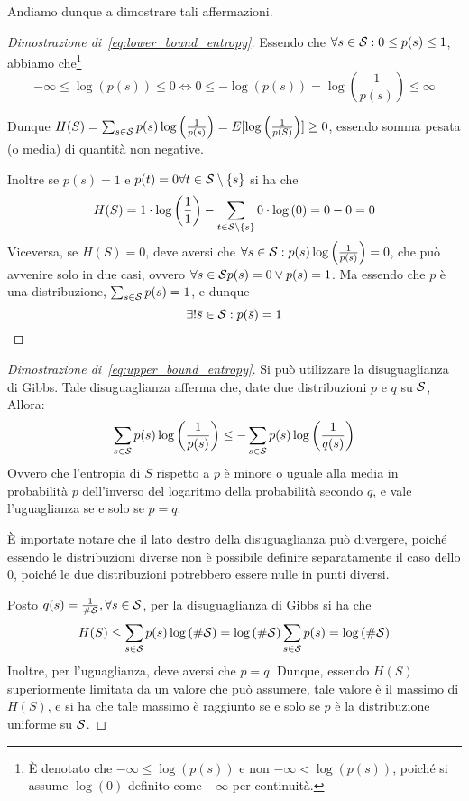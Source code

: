 Andiamo dunque a dimostrare tali affermazioni.

\begin{proof}[Dimostrazione di~\ref{eq:lower_bound_entropy}]
  Essendo che \(\forall s \in \mathcal{S}: 0\leq p(s) \leq 1\), abbiamo che\footnote{È denotato che \(-\infty \leq \log\left(p(s)\right)\) e non \(-\infty < \log\left(p(s)\right)\), poiché si assume \(\log\left(0\right)\) definito come \(-\infty\) per continuità.}
  \[-\infty \leq \log\left(p(s)\right) \leq 0 \iff  0 \leq -\log\left(p(s)\right) = \log\left(\frac{1}{p(s)}\right) \leq \infty\]

  Dunque \(H(S) = \sum_{s \in \mathcal{S}} p(s) \log\left(\frac{1}{p(s)}\right) = E[\log\left(\frac{1}{p(S)}\right)] \geq 0\), essendo somma pesata (o media) di quantità non negative.

  Inoltre se \(p(s) = 1\) e \(p(t) = 0 \forall t \in \SCal \setminus \set{s}\) si ha che
  \[H(S) = 1 \cdot \log\left(\frac{1}{1}\right) - \sum_{t \in \SCal \setminus \set{s}} 0 \cdot \log\left(0\right) = 0 - 0 = 0\]
  Viceversa, se \(H(S) = 0\), deve aversi che \(\forall s \in \mathcal{S}: p(s) \log\left(\frac{1}{p(s)}\right) = 0\), che può avvenire solo in due casi, ovvero \(\forall s \in \mathcal{S} p(s) = 0 \lor p(s) = 1\).
  Ma essendo che \(p\) è una distribuzione, \(\sum_{s \in \mathcal{S}} p(s) = 1\), e dunque
  \[\exists!\bar{s} \in \mathcal{S}: p(\bar{s}) = 1\]
\end{proof}

\begin{proof}[Dimostrazione di~\ref{eq:upper_bound_entropy}]
  Si può utilizzare la disuguaglianza di Gibbs.
  Tale disuguaglianza afferma che, date due distribuzioni \(p\) e \(q\) su \(\mathcal{S}\), Allora:
  \begin{equation}\label{eq:gibbs}
    \sum_{s \in \mathcal{S}} p(s) \log\left(\frac{1}{p(s)}\right) \leq -\sum_{s \in \mathcal{S}} p(s) \log\left(\frac{1}{q(s)}\right)
  \end{equation}
  Ovvero che l'entropia di \(S\) rispetto a \(p\) è minore o uguale alla media in probabilità \(p\) dell'inverso del logaritmo della probabilità secondo \(q\), e vale l'uguaglianza se e solo se \(p = q\).
  \begin{note}{}
    È importate notare che il lato destro della disuguaglianza può divergere, poiché essendo le distribuzioni diverse non è possibile definire separatamente il caso dello \(0\), poiché le due distribuzioni potrebbero essere nulle in punti diversi.
  \end{note}
  Posto \(q(s) = \frac{1}{\#\mathcal{S}}, \forall s \in \mathcal{S}\), per la disuguaglianza di Gibbs si ha che
  \[H(S) \leq \sum_{s \in \mathcal{S}} p(s) \log\left(\#\mathcal{S}\right) = \log\left(\#\mathcal{S}\right)\sum_{s \in \mathcal{S}} p(s) = \log\left(\#\mathcal{S}\right)\]
  Inoltre, per l'uguaglianza, deve aversi che \(p = q\). Dunque, essendo \(H(S)\) superiormente limitata da un valore che può assumere, tale valore è il massimo di \(H(S)\), e si ha che tale massimo è raggiunto se e solo se \(p\) è la distribuzione uniforme su \(\mathcal{S}\).
\end{proof}

